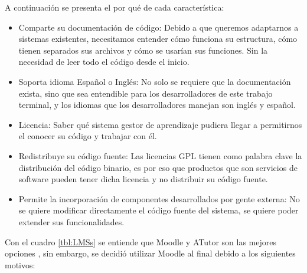     \noindent A continuación se presenta el por qué de cada característica:
    \begin{itemize}
        \item Comparte su documentación de código: Debido a que queremos adaptarnos a sistemas existentes, necesitamos entender cómo funciona su estructura, cómo tienen separados sus archivos y cómo se usarían sus funciones. Sin la necesidad de leer todo el código desde el inicio. 
        \item Soporta idioma Español o Inglés: No solo se requiere que la documentación exista, sino que sea entendible para los desarrolladores de este trabajo terminal, y los idiomas que los desarrolladores manejan son inglés y español.
        \item Licencia: Saber qué sistema gestor de aprendizaje pudiera llegar a permitirnos el conocer su código y trabajar con él.
        \item Redistribuye su código fuente: Las licencias GPL tienen como palabra clave la distribución del código binario, es por eso que productos que son servicios de software pueden tener dicha licencia y no distribuir su código fuente.
        \item Permite la incorporación de componentes desarrollados por gente externa: No se quiere modificar directamente el código fuente del sistema, se quiere poder extender sus funcionalidades.
    \end{itemize}
    
    
\begin{comment}
    \noindent Las fuentes para cada columna de la tabla se obtuvieron de las respectivas páginas de los sistemas gestores de aprendizaje. Dichas páginas se pueden encontrar en:
    \begin{itemize}
        \item Moodle: {https://moodle.com/}
        \item ATutor: {https://atutor.github.io/}
        \item Docebo: {https://www.docebo.com/es/}
        \item Litmos: {https://www.litmos.com/es-LA/}
        \item Gnosis Conect: {https://www.gnosisconnect.com/}
        \item TalentLMS: {https://www.talentlms.com/}
    \end{itemize}
\end{comment}   
    
    \noindent Con el cuadro  \ref{tbl:LMSs} se entiende que Moodle y ATutor son las mejores opciones , sin embargo, se decidió utilizar Moodle al final debido a los siguientes motivos:
    
